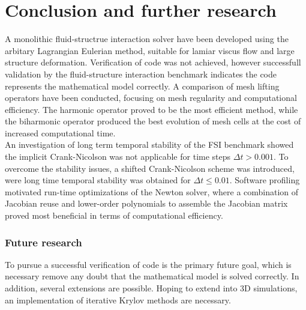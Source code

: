 \chapter{Conclusion and further research}
A monolithic fluid-structrue interaction solver have been developed using the arbitary Lagrangian Eulerian method, suitable for lamiar viscus flow and large structure deformation. Verification of code was not achieved, however successfull validation by the fluid-structure interaction benchmark \cite{Hron2006} indicates the code represents the mathematical model correctly. A comparison of mesh lifting operators have been conducted, focusing on mesh regularity and computational efficiency. The harmonic operator proved to be the most efficient method, while the biharmonic operator produced the best evolution of mesh cells at the cost of increased computational time. \\

 An investigation of long term temporal stability of the FSI benchmark showed the implicit Crank-Nicolson was not applicable for time steps $\Delta t > 0.001$. To overcome the stability issues, a shifted Crank-Nicolson scheme was introduced, were long time temporal stability was obtained for $\Delta t \leq 0.01$. Software profiling motivated run-time optimizations of the Newton solver, where a combination of Jacobian reuse and lower-order polynomials to assemble the Jacobian matrix proved most beneficial in terms of computational efficiency.  \\

\subsection*{Future research}
To pursue a successful verification of code is the primary future goal, which is necessary remove any doubt that the mathematical model is solved correctly. In addition, several extensions are possible. Hoping to extend into 3D simulations, an implementation of iterative Krylov methods are necessary. 
